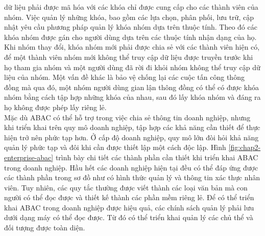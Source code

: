 dữ liệu phải được mã hóa với các khóa chỉ được cung cấp cho các thành viên của nhóm.
Việc quản lý những khóa, bao gồm các lựa chọn, phân phối, lưu trữ, cập nhật yêu cầu
phương pháp quản lý khóa nhóm dựa trên thuộc tính. Theo đó các khóa nhóm được gán
cho người dùng dựa trên các thuộc tính nhận dạng của họ. \\
\indent Khi nhóm thay đổi, khóa nhóm mới phải được chia sẻ với các thành viên hiện có,
để một thành viên nhóm mới không thể truy cập dữ liệu được truyền trước khi họ tham
gia nhóm và một người dùng đã rời đi khỏi nhóm không thể truy cập dữ liệu của nhóm.
Một vấn đề khác là bảo vệ chống lại các cuộc tấn công thông đồng mà qua đó, một nhóm người dùng gian lận thông đồng có thể có được khóa nhóm bằng cách tập hợp những
khóa của nhau, sau đó lấy khóa nhóm và đáng ra họ không được phép lấy riêng lẻ. \\
\indent Mặc dù ABAC có thể hỗ trợ trong việc chia sẻ thông tin doanh nghiệp, nhưng khi
triển khai trên quy mô doanh nghiệp, tập hợp các khả năng cần thiết để thực hiện trở nên
phức tạp hơn. Ở cấp độ doanh nghiệp, quy mô lớn đòi hỏi khả năng quản lý phức tạp và
đôi khi cần được thiết lập một cách độc lập. Hình \ref{fig:chap2-enterprise-abac} trình bày chi tiết các thành phần cần thiết khi triển khai ABAC trong
doanh nghiệp. Hầu hết các doanh nghiệp hiện tại đều có thể đáp ứng được các thành
phần trong sơ đồ như có hình thức quản lý và thông tin xác thực nhân viên. Tuy nhiên,
các quy tắc thường được viết thành các loại văn bản mà con người có thể đọc được và
thiết kế thành các phần mềm riêng lẻ. Để có thể triển khai ABAC trong doanh nghiệp
được hiệu quả, các chính sách quản lý phải lưu dưới dạng máy có thể đọc được. Từ đó
có thể triển khai quản lý các chủ thể và đối tượng được toàn diện.

